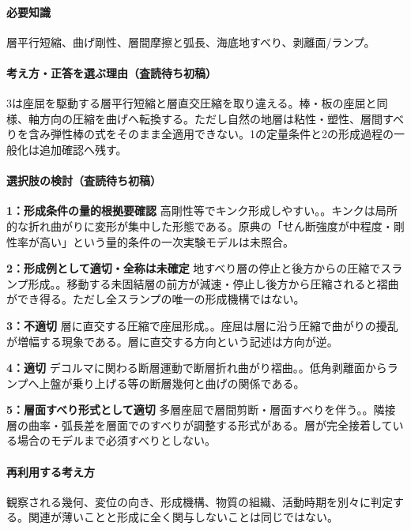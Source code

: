 \paragraph{必要知識} 層平行短縮、曲げ剛性、層間摩擦と弧長、海底地すべり、剥離面/ランプ。

\paragraph{考え方・正答を選ぶ理由（査読待ち初稿）} 3は座屈を駆動する層平行短縮と層直交圧縮を取り違える。棒・板の座屈と同様、軸方向の圧縮を曲げへ転換する。ただし自然の地層は粘性・塑性、層間すべりを含み弾性棒の式をそのまま全適用できない。1の定量条件と2の形成過程の一般化は追加確認へ残す。

\paragraph{選択肢の検討（査読待ち初稿）}\mbox{}\par

\noindent\textbf{1：形成条件の量的根拠要確認} 高剛性等でキンク形成しやすい。。キンクは局所的な折れ曲がりに変形が集中した形態である。原典の「せん断強度が中程度・剛性率が高い」という量的条件の一次実験モデルは未照合。\par

\noindent\textbf{2：形成例として適切・全称は未確定} 地すべり層の停止と後方からの圧縮でスランプ形成。。移動する未固結層の前方が減速・停止し後方から圧縮されると褶曲ができ得る。ただし全スランプの唯一の形成機構ではない。\par

\noindent\textbf{3：不適切} 層に直交する圧縮で座屈形成。。座屈は層に沿う圧縮で曲がりの擾乱が増幅する現象である。層に直交する方向という記述は方向が逆。\par

\noindent\textbf{4：適切} デコルマに関わる断層運動で断層折れ曲がり褶曲。。低角剥離面からランプへ上盤が乗り上げる等の断層幾何と曲げの関係である。\par

\noindent\textbf{5：層面すべり形式として適切} 多層座屈で層間剪断・層面すべりを伴う。。隣接層の曲率・弧長差を層面でのすべりが調整する形式がある。層が完全接着している場合のモデルまで必須すべりとしない。\par

\paragraph{再利用する考え方} 観察される幾何、変位の向き、形成機構、物質の組織、活動時期を別々に判定する。関連が薄いことと形成に全く関与しないことは同じではない。

